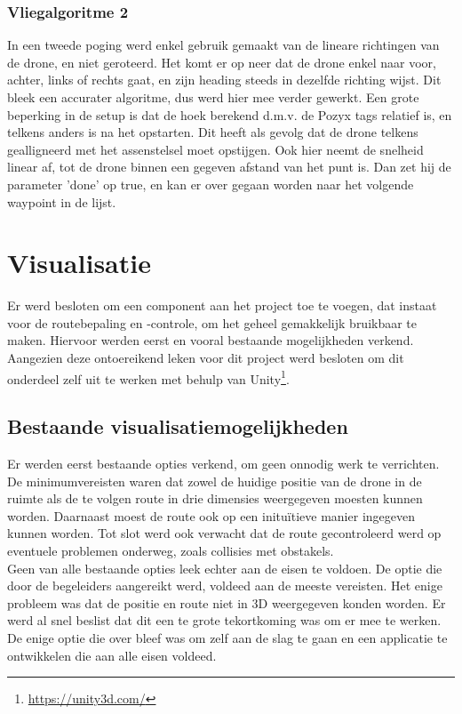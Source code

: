 \subsubsection{Vliegalgoritme 2}
In een tweede poging werd enkel gebruik gemaakt van de lineare richtingen van de drone, en niet geroteerd. Het komt er op neer dat de drone enkel naar voor, achter, links of rechts gaat, en zijn heading steeds in dezelfde richting wijst. Dit bleek een accurater algoritme, dus werd hier mee verder gewerkt. Een grote beperking in de setup is dat de hoek berekend d.m.v. de Pozyx tags relatief is, en telkens anders is na het opstarten. Dit heeft als gevolg dat de drone telkens gealligneerd met het assenstelsel moet opstijgen. Ook hier neemt de
snelheid linear af, tot de drone binnen een gegeven afstand van het punt is. Dan zet hij de
parameter ’done’ op true, en kan er over gegaan worden naar het volgende waypoint in de
lijst.
\section{Visualisatie} \label{sec:visualization}
Er werd besloten om een component aan het project toe te voegen, dat instaat voor de routebepaling en -controle, om het geheel gemakkelijk bruikbaar te maken.
Hiervoor werden eerst en vooral bestaande mogelijkheden verkend.
Aangezien deze ontoereikend leken voor dit project werd besloten om dit onderdeel zelf uit te werken met behulp van Unity\footnote{\url{https://unity3d.com/}}.

\subsection{Bestaande visualisatiemogelijkheden} \label{sec:opties}
Er werden eerst bestaande opties verkend, om geen onnodig werk te verrichten. De minimumvereisten waren dat zowel de huidige positie van de drone in de ruimte als de te volgen route in drie dimensies weergegeven moesten kunnen worden. Daarnaast moest de route ook op een initu\"itieve manier ingegeven kunnen worden. Tot slot werd ook verwacht dat de route gecontroleerd werd op eventuele problemen onderweg, zoals collisies met obstakels.\\

Geen van alle bestaande opties leek echter aan de eisen te voldoen. De optie die door de begeleiders aangereikt werd, voldeed aan de meeste vereisten. Het enige probleem was dat de positie en route niet in 3D weergegeven konden worden. Er werd al snel beslist dat dit een te grote tekortkoming was om er mee te werken. De enige optie die over bleef was om zelf aan de slag te gaan en een applicatie te ontwikkelen die aan alle eisen voldeed.

